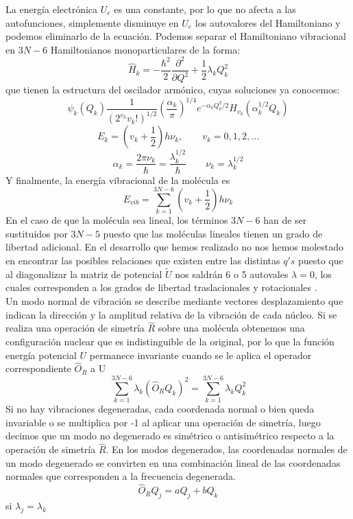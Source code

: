\documentclass[a4paper]{article}
\begin{document}
La energía electrónica $U_e$ es una constante, por lo que no afecta a las autofunciones, simplemente disminuye en $U_e$ los autovalores del Hamiltoniano y podemos eliminarlo de la ecuación. Podemos separar el Hamiltoniano vibracional en $3N-6$ Hamiltonianos monoparticulares de la forma:
\begin{equation}
\hat H_k = -\frac{\hbar^2}{2}\frac{\partial^2}{\partial Q^2}+\frac{1}{2}\lambda_kQ_k^2
\end{equation}
que tienen la estructura del oscilador armónico, cuyas soluciones ya conocemos:
\begin{equation}
\psi_k(Q_k)\frac{1}{\left(2^{v_k}v_k!\right)^{1/2}}\left(\frac{\alpha_k}{\pi}\right)^{1/4}e^{-\alpha_kQ^2_k/2}H_{v_k}(\alpha_k^{1/2}Q_k)
\end{equation}
\begin{equation}
E_k=\left(v_k+\frac{1}{2}\right)h\nu_k,	\qquad v_k=0,1,2,...
\end{equation}
\begin{equation}
\alpha_k=\frac{2\pi\nu_k}{\hbar}=\frac{\lambda_k^{1/2}}{\hbar} \qquad \nu_k=\lambda_k^{1/2}
\end{equation}
Y finalmente, la energía vibracional de la molécula es
\begin{equation}
E_{vib}=\sum_{k=1}^{3N-6}\left(v_k+\frac{1}{2}\right)h\nu_k
\end{equation}
En el caso de que la molécula sea lineal, los términos $3N-6$ han de ser sustituidos por $3N-5$ puesto que las moléculas lineales tienen un grado de libertad adicional.
En el desarrollo que hemos realizado no nos hemos molestado en encontrar las posibles relaciones que existen entre las distintas $q's$ puesto que al diagonalizar la matriz de potencial $\tilde U$ nos saldrán 6 o 5 autovales $\lambda = 0$, los cuales corresponden a los grados de libertad traslacionales y rotacionales \cite{wilson1980}\cite{levine1980}.\\

Un modo normal de vibración se describe mediante vectores desplazamiento que indican la dirección y la amplitud relativa de la vibración de cada núcleo. Si se realiza una operación de simetría $\hat R$ sobre una molécula obtenemos una configuración nuclear que es indistinguible de la original, por lo que la función energía potencial $U$ permanece invariante cuando se le aplica el operador correspondiente $\hat O_R$ a U
\begin{equation}
\sum_{k=1}^{3N-6}\lambda_k(\hat O_RQ_k)^2=\sum_{k=1}^{3N-6}\lambda_kQ_k^2
\end{equation} 
Si no hay vibraciones degeneradas, cada coordenada normal o bien queda invariable o se multiplica por -1 al aplicar una operación de simetría, luego decimos que un modo no degenerado es simétrico o antisimétrico respecto a la operación de simetría $\hat R$. En los modos degenerados, las coordenadas normales de un modo degenerado se convirten en una combinación lineal de las coordenadas normales que corresponden a la frecuencia degenerada.
\begin{equation}
\hat O_RQ_j = aQ_j + bQ_k
\end{equation}
si $\lambda_j=\lambda_k$\\
\end{document}
